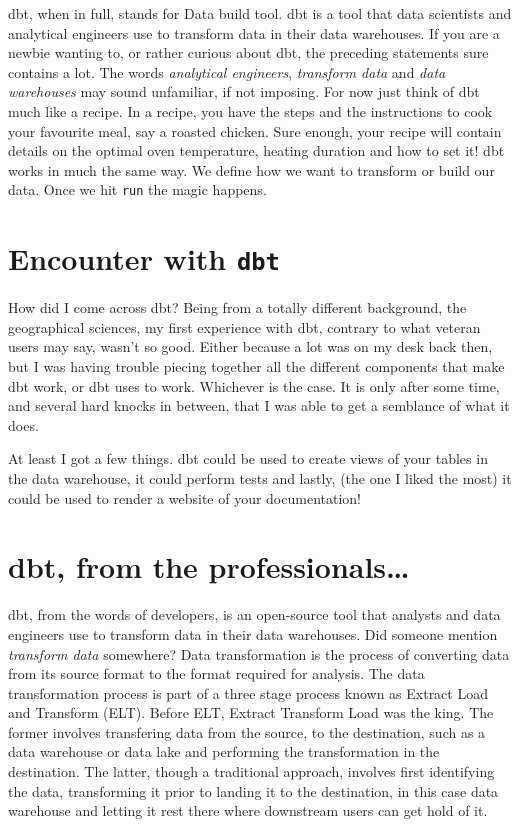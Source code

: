 \documentclass[
]{book}
\begin{document}
dbt, when in full, stands for Data build tool. dbt is a tool that data scientists and analytical engineers use to transform data in their data warehouses. If you are a newbie wanting to, or rather curious about dbt, the preceding statements sure contains a lot. The words \emph{analytical engineers}, \emph{transform data} and \emph{data warehouses} may sound unfamiliar, if not imposing. For now just think of dbt much like a recipe. In a recipe, you have the steps and the instructions to cook your favourite meal, say a roasted chicken. Sure enough, your recipe will contain details on the optimal oven temperature, heating duration and how to set it! dbt works in much the same way. We define how we want to transform or build our data. Once we hit \texttt{run} the magic happens.

\hypertarget{encounter-with-dbt}{%
\section{\texorpdfstring{Encounter with \texttt{dbt}}{Encounter with dbt}}\label{encounter-with-dbt}}

How did I come across dbt? Being from a totally different background, the geographical sciences, my first experience with dbt, contrary to what veteran users may say, wasn't so good. Either because a lot was on my desk back then, but I was having trouble piecing together all the different components that make dbt work, or dbt uses to work. Whichever is the case. It is only after some time, and several hard knocks in between, that I was able to get a semblance of what it does.

At least I got a few things. dbt could be used to create views of your tables in the data warehouse, it could perform tests and lastly, (the one I liked the most) it could be used to render a website of your documentation!

\hypertarget{dbt-from-the-professionals}{%
\section{dbt, from the professionals\ldots{}}\label{dbt-from-the-professionals}}

dbt, from the words of developers, is an open-source tool that analysts and data engineers use to transform data in their data warehouses. Did someone mention \emph{transform data} somewhere? Data transformation is the process of converting data from its source format to the format required for analysis. The data transformation process is part of a three stage process known as Extract Load and Transform (ELT). Before ELT, Extract Transform Load was the king. The former involves transfering data from the source, to the destination, such as a data warehouse or data lake and performing the transformation in the destination. The latter, though a traditional approach, involves first identifying the data, transforming it prior to landing it to the destination, in this case data warehouse and letting it rest there where downstream users can get hold of it.
\end{document}
